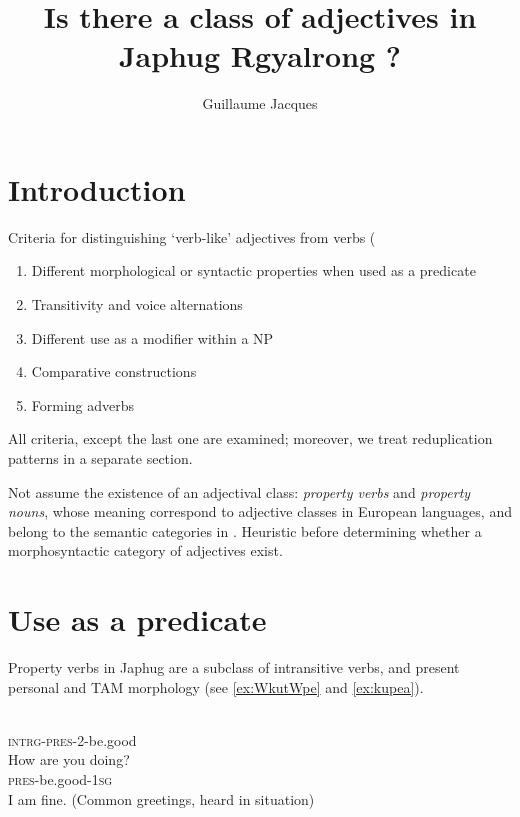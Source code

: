 \documentclass[oldfontcommands,oneside,a4paper,11pt]{article}
\newcommand{\ipa}[1]{{\phon \mbox{#1}}} %
\begin{document}
 
\linenumbers
\title{Is there a class of adjectives in Japhug Rgyalrong ? }
\author{Guillaume Jacques}
\maketitle

 
\section{Introduction}

\citet{dixon04adjective}
\citet{dixaikhenvald04adjectives}


Criteria for distinguishing `verb-like' adjectives from verbs (\citealt[15-22]{dixon04adjective}

\begin{enumerate}
\item Different morphological or syntactic properties when used as a predicate
\item Transitivity and voice alternations
\item Different use as a modifier within a NP
\item Comparative constructions
\item Forming adverbs
\end{enumerate}

All criteria, except the last one are examined; moreover, we treat  reduplication patterns in a separate section.

Not assume the existence of an adjectival class: \textit{property verbs} and \textit{property nouns}, whose meaning correspond to adjective classes in European languages, and belong to the   semantic categories in \citet[3-5]{dixon04adjective}. Heuristic before determining whether a morphosyntactic category of adjectives exist. 

\section{Use as a predicate}
Property verbs in Japhug are a subclass of intransitive verbs, and present personal and TAM morphology (see \ref{ex:WkutWpe} and \ref{ex:kupea}). 

\begin{exe}
\ex \label{ex:WkutWpe}
\gll \ipa{ɯ-kú-tɯ-pe?} \\
\textsc{intrg-pres}-2-be.good \\
\glt How are you doing?
\ex \label{ex:kupea}
\gll \ipa{ku-pe-a} \\
\textsc{pres}-be.good-\textsc{1sg}   \\
\glt I am fine. (Common greetings, heard in situation)
\end{exe}
\end{document}
